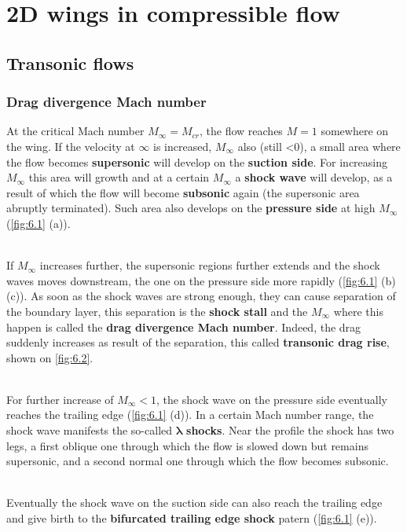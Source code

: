 
\chapter{2D wings in compressible flow}
\setcounter{section}{1}

\section{Transonic flows}
\subsection{Drag divergence Mach number}
	At the critical Mach number $M_\infty = M_{cr}$, the flow reaches $M=1$ somewhere on the wing. If the velocity at $\infty$ is increased, $M_\infty$ also (still <0), a small area where the flow becomes \textbf{supersonic} will develop on the \textbf{suction side}. For increasing $M_\infty$ this area will growth and at a certain $M_\infty$ a \textbf{shock wave} will develop, as a result of which the flow will become \textbf{subsonic} again (the supersonic area abruptly terminated). Such area also develops on the \textbf{pressure side} at high $M_\infty$ (\autoref{fig:6.1} (a)).
	
	\ \\ If $M_\infty$ increases further, the supersonic regions further extends and the shock waves moves downstream, the one on the pressure side more rapidly (\autoref{fig:6.1} (b) (c)). As soon as the shock waves are strong enough, they can cause separation of the boundary layer, this separation is the \textbf{shock stall} and the $M_\infty$ where this happen is called the \textbf{drag divergence Mach number}. Indeed, the drag suddenly increases as result of the separation, this called \textbf{transonic drag rise}, shown on \autoref{fig:6.2}. 
	
	\ \\ For further increase of $M_\infty <1$, the shock wave on the pressure side eventually reaches the trailing edge (\autoref{fig:6.1} (d)). In a certain Mach number range, the shock wave manifests the so-called $\bm{\lambda}$ \textbf{shocks}. Near the profile the shock has two legs, a first oblique one through which the flow is slowed down but remains supersonic, and a second normal one through which the flow becomes subsonic. 
	
	\ \\ Eventually the shock wave on the suction side can also reach the trailing edge and give birth to the \textbf{bifurcated trailing edge shock} patern (\autoref{fig:6.1} (e)). 
	
